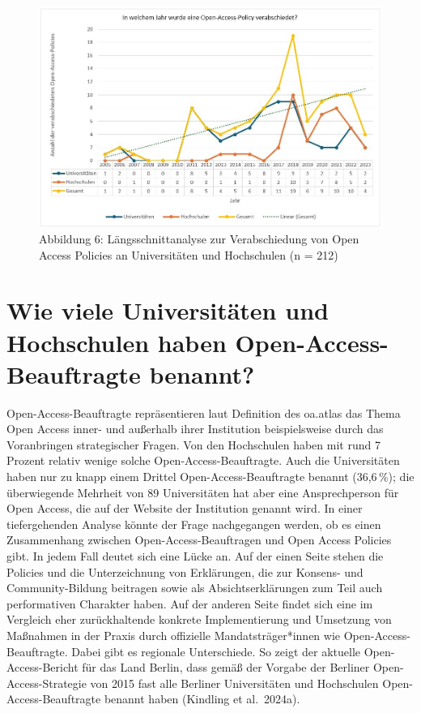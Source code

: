 \documentclass[a4paper,
fontsize=11pt,
oneside,
numbers=noperiodatend,
parskip=half-,
bibliography=totoc,
final
]{scrartcl}
\begin{document}
\begin{figure}[H]
\centering
\includegraphics[width=1\textwidth]{img/image006.jpg}
\caption{Abbildung 6: Längsschnittanalyse zur Verabschiedung von Open Access Policies an Universitäten und Hochschulen (n = 212)}
\end{figure}

\section{Wie viele Universitäten und Hochschulen haben
Open-Access-Beauftragte
benannt?}\label{wie-viele-universituxe4ten-und-hochschulen-haben-open-access-beauftragte-benannt}

Open-Access-Beauftragte repräsentieren laut Definition des oa.atlas das
Thema Open Access inner- und außerhalb ihrer Institution beispielsweise
durch das Voranbringen strategischer Fragen. Von den Hochschulen haben
mit rund 7 Prozent relativ wenige solche Open-Access-Beauf\-tragte.
Auch die Universitäten haben nur zu knapp einem Drittel
Open-Access-Beauftragte benannt (36,6\,\%); die überwiegende Mehrheit von
89 Universitäten hat aber eine Ansprechperson für Open Access, die auf
der Website der Institution genannt wird. In einer tiefergehenden
Analyse könnte der Frage nachgegangen werden, ob es einen Zusammenhang
zwischen Open-Access-Beauftragen und Open Access Policies gibt. In jedem
Fall deutet sich eine Lücke an. Auf der einen Seite stehen die Policies
und die Unterzeichnung von Erklärungen, die zur Konsens- und
Community-Bildung beitragen sowie als Absichtserklärungen zum Teil auch
performativen Charakter haben. Auf der anderen Seite findet sich eine im
Vergleich eher zurückhaltende konkrete Implementierung und Umsetzung von
Maßnahmen in der Praxis durch offizielle Mandatsträger*innen wie
Open-Access-Beauftragte. Dabei gibt es regionale Unterschiede. So zeigt
der aktuelle Open-Access-Bericht für das Land Berlin, dass gemäß der
Vorgabe der Berliner Open-Access-Strategie von 2015 fast alle Berliner
Universitäten und Hochschulen Open-Access-Beauftragte benannt haben
(Kindling et al.~2024a).
\end{document}
